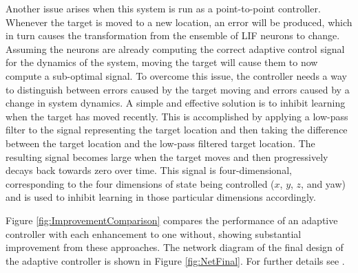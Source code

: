 \documentclass[letterpaper, 10 pt, conference]{ieeeconf}  %
\begin{document}
Another issue arises when this system is run as a point-to-point controller.
Whenever the target is moved to a new location, an error will be produced, which in turn causes the transformation from the ensemble of LIF neurons to change.
Assuming the neurons are already computing the correct adaptive control signal for the dynamics of the system, moving the target will cause them to now compute a sub-optimal signal.
To overcome this issue, the controller needs a way to distinguish between errors caused by the target moving and errors caused by a change in system dynamics.
A simple and effective solution is to inhibit learning when the target has moved recently.
This is accomplished by applying a low-pass filter to the signal representing the target location and then taking the difference between the target location and the low-pass filtered target location.
The resulting signal becomes large when the target moves and then progressively decays back towards zero over time. %
This signal is four-dimensional, corresponding to the four dimensions of state being controlled ($x$, $y$, $z$, and yaw) and is used to inhibit learning in those particular dimensions accordingly.


Figure \ref{fig:ImprovementComparison} compares the performance of an adaptive controller with each enhancement to one without, showing substantial improvement from these approaches.
The network diagram of the final design of the adaptive controller is shown in Figure \ref{fig:NetFinal}.
For further details see \cite{komer2015biologically}.
\end{document}
